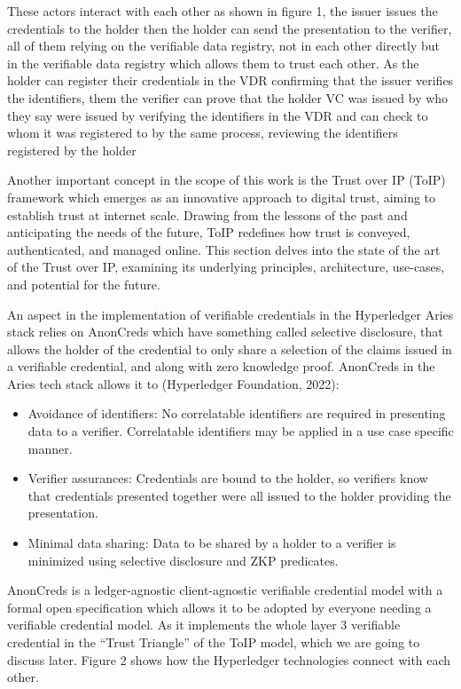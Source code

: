 These actors interact with each other as shown in figure 1, the issuer issues the credentials to the holder then the holder can send the presentation to the verifier, all of them relying on the verifiable data registry, not in each other directly but in the verifiable data registry which allows them to trust each other. As the holder can register their credentials in the VDR confirming that the issuer verifies the identifiers, them the verifier can prove that the holder VC was issued by who they say were issued by verifying the identifiers in the VDR and can check to whom it was registered to by the same process, reviewing the identifiers registered by the holder

Another important concept in the scope of this work is the Trust over IP (ToIP) framework which emerges as an innovative approach to digital trust, aiming to establish trust at internet scale. Drawing from the lessons of the past and anticipating the needs of the future, ToIP redefines how trust is conveyed, authenticated, and managed online. This section delves into the state of the art of the Trust over IP, examining its underlying principles, architecture, use-cases, and potential for the future.

An aspect in the implementation of verifiable credentials in the Hyperledger Aries stack relies on AnonCreds which have something called selective disclosure, that allows the holder of the credential to only share a selection of the claims issued in a verifiable credential, and along with zero knowledge proof. AnonCreds in the Aries tech stack allows it to (Hyperledger Foundation, 2022):

\begin{itemize}
    \item Avoidance of identifiers: No correlatable identifiers are required in presenting data to a verifier. Correlatable identifiers may be applied in a use case specific manner.
    \item Verifier assurances: Credentials are bound to the holder, so verifiers know that credentials presented together were all issued to the holder providing the presentation.
    \item Minimal data sharing: Data to be shared by a holder to a verifier is minimized using selective disclosure and ZKP predicates.
\end{itemize}

AnonCreds is a ledger-agnostic client-agnostic verifiable credential model with a formal open specification which allows it to be adopted by everyone needing a verifiable credential model. As it implements the whole layer 3 verifiable credential in the “Trust Triangle” of the ToIP model, which we are going to discuss later. Figure 2 shows how the Hyperledger technologies connect with each other.

